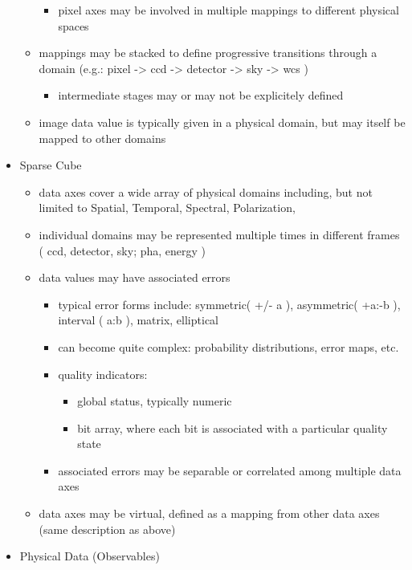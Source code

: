 \documentclass[11pt,a4paper]{ivoa}
\begin{document}
\begin{itemize}
\begin{itemize}
\begin{itemize}
          \item pixel axes may be involved in multiple mappings to different physical spaces
        \end{itemize}
        \item mappings may be stacked to define progressive transitions through a domain (e.g.:  pixel -> ccd -> detector -> sky -> wcs )
        \begin{itemize}
           \item intermediate stages may or may not be explicitely defined 
        \end{itemize}
        \item image data value is typically given in a physical domain, but may itself be mapped to other domains
    \end{itemize}
    \item Sparse Cube
    \begin{itemize}
       \item data axes cover a wide array of physical domains including, but not limited to Spatial, Temporal, Spectral, Polarization,
       \item individual domains may be represented multiple times in different frames ( ccd, detector, sky;  pha, energy )
       \item data values may have associated errors
       \begin{itemize}
          \item typical error forms include: symmetric( +/- a ), asymmetric( +a:-b ), interval ( a:b ), matrix, elliptical
          \item can become quite complex: probability distributions, error maps, etc.
          \item quality indicators:
          \begin{itemize}
             \item global status, typically numeric
             \item bit array, where each bit is associated with a particular quality state 
          \end{itemize}
          \item associated errors may be separable or correlated among multiple data axes
        \end{itemize}
        \item data axes may be virtual, defined as a mapping from other data axes (same description as above)
    \end{itemize}
    \item Physical Data (Observables)

\end{itemize}
\end{document}
